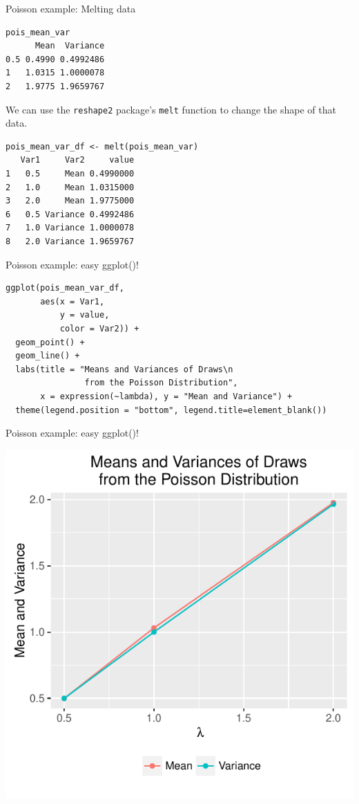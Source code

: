 \documentclass{beamer}
\begin{document}
\begin{frame}[fragile]{Poisson example: Melting data}
\begin{footnotesize}
\begin{verbatim}
pois_mean_var
      Mean  Variance
0.5 0.4990 0.4992486
1   1.0315 1.0000078
2   1.9775 1.9659767
\end{verbatim}

We can use the \texttt{reshape2} package's \texttt{melt} function to change the shape of that data.
\begin{verbatim}
pois_mean_var_df <- melt(pois_mean_var)
   Var1     Var2     value
1   0.5     Mean 0.4990000
2   1.0     Mean 1.0315000
3   2.0     Mean 1.9775000
6   0.5 Variance 0.4992486
7   1.0 Variance 1.0000078
8   2.0 Variance 1.9659767
\end{verbatim}
\end{footnotesize}
\end{frame}

\begin{frame}[fragile]{Poisson example: easy ggplot()!}
\begin{footnotesize}
\begin{verbatim}
ggplot(pois_mean_var_df,
       aes(x = Var1,
           y = value,
           color = Var2)) +
  geom_point() +
  geom_line() +
  labs(title = "Means and Variances of Draws\n
                from the Poisson Distribution", 
       x = expression(~lambda), y = "Mean and Variance") +
  theme(legend.position = "bottom", legend.title=element_blank())
\end{verbatim}
\end{footnotesize}
\end{frame}

\begin{frame}{Poisson example: easy ggplot()!}
\begin{center}\includegraphics[scale=.8]{figures/MeltExample.pdf}\end{center}
\end{frame}
\end{document}

